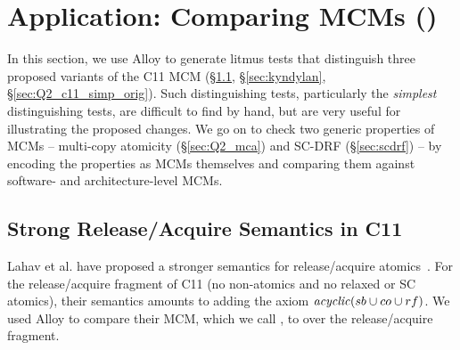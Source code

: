 \section{Application: Comparing MCMs ()}
\label{sec:discrep}

In this section, we use Alloy to generate litmus tests that
distinguish three proposed variants of the C11 MCM
(\S\ref{sec:Q2_c11_sra_simp}, \S\ref{sec:kyndylan},
\S\ref{sec:Q2_c11_simp_orig}). Such distinguishing tests, particularly
the \emph{simplest} distinguishing tests, are difficult to find by
hand, but are very useful for illustrating the proposed changes. We go
on to check two generic properties of MCMs -- multi-copy atomicity
(\S\ref{sec:Q2_mca}) and SC-DRF (\S\ref{sec:scdrf}) -- by encoding the
properties as MCMs themselves and comparing them against software- and
architecture-level MCMs.

\subsection{Strong Release/Acquire Semantics in C11}
\label{sec:Q2_c11_sra_simp}
Lahav et al. have proposed a stronger semantics for release/acquire
atomics~\cite{lahav+16}. For the release/acquire fragment of C11 (no
non-atomics and no relaxed or SC atomics), their semantics amounts to
adding the axiom $\mathit{acyclic}(sb \cup co \cup rf)$. We used Alloy to
compare their MCM, which we call , to  over the
release/acquire fragment.

